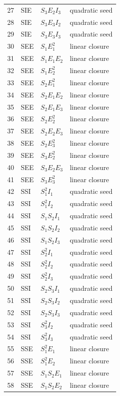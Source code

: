 \begin{longtable}{@{}rlll@{}}
27 & SIE & $S_3E_2I_3$ & quadratic seed \\
28 & SIE & $S_3E_3I_2$ & quadratic seed \\
29 & SIE & $S_3E_3I_3$ & quadratic seed \\
30 & SEE & $S_1E_1^{2}$ & linear closure \\
31 & SEE & $S_1E_1E_2$ & linear closure \\
32 & SEE & $S_1E_2^{2}$ & linear closure \\
33 & SEE & $S_2E_1^{2}$ & linear closure \\
34 & SEE & $S_2E_1E_2$ & linear closure \\
35 & SEE & $S_2E_1E_3$ & linear closure \\
36 & SEE & $S_2E_2^{2}$ & linear closure \\
37 & SEE & $S_2E_2E_3$ & linear closure \\
38 & SEE & $S_2E_3^{2}$ & linear closure \\
39 & SEE & $S_3E_2^{2}$ & linear closure \\
40 & SEE & $S_3E_2E_3$ & linear closure \\
41 & SEE & $S_3E_3^{2}$ & linear closure \\
42 & SSI & $S_1^{2}I_1$ & quadratic seed \\
43 & SSI & $S_1^{2}I_2$ & quadratic seed \\
44 & SSI & $S_1S_2I_1$ & quadratic seed \\
45 & SSI & $S_1S_2I_2$ & quadratic seed \\
46 & SSI & $S_1S_2I_3$ & quadratic seed \\
47 & SSI & $S_2^{2}I_1$ & quadratic seed \\
48 & SSI & $S_2^{2}I_2$ & quadratic seed \\
49 & SSI & $S_2^{2}I_3$ & quadratic seed \\
50 & SSI & $S_2S_3I_1$ & quadratic seed \\
51 & SSI & $S_2S_3I_2$ & quadratic seed \\
52 & SSI & $S_2S_3I_3$ & quadratic seed \\
53 & SSI & $S_3^{2}I_2$ & quadratic seed \\
54 & SSI & $S_3^{2}I_3$ & quadratic seed \\
55 & SSE & $S_1^{2}E_1$ & linear closure \\
56 & SSE & $S_1^{2}E_2$ & linear closure \\
57 & SSE & $S_1S_2E_1$ & linear closure \\
58 & SSE & $S_1S_2E_2$ & linear closure \\

\end{longtable}
